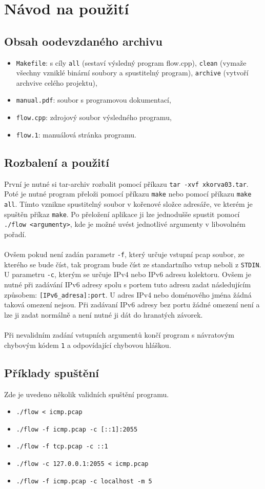 \documentclass[12pt]{article}
\begin{document}
\section{Návod na použití}
\subsection{Obsah oodevzdaného archivu}
\begin{itemize}
	\item {\texttt{Makefile}: s cíly \texttt{all} (sestaví výsledný program flow.cpp), \texttt{clean} (vymaže všechny vzniklé binární soubory a spustitelný program), \texttt{archive} (vytvoří archvive celého projektu),}
	\item {\texttt{manual.pdf}: soubor s programovou dokumentací,}
	\item {\texttt{flow.cpp}: zdrojový soubor výsledného programu,}
	\item {\texttt{flow.1}: manuálová stránka programu.}
\end{itemize}
\subsection{Rozbalení a použití}
První je nutné si tar-archiv rozbalit pomocí příkazu \texttt{tar -xvf xkorva03.tar}. Poté je nutné program přeloži pomocí příkazu \texttt{make} nebo
pomocí příkazu \texttt{make all}. Tímto vznikne spustitelný soubor v kořenové složce adresáře, ve kterém je spuštěn příkaz \texttt{make}. 
Po přeložení aplikace ji lze jednodušše spustit pomocí \texttt{./flow <argumenty>}, kde je možné uvést jednotlivé argumenty v libovolném pořadí.
\\\\ 
Ovšem pokud není zadán parametr \texttt{-f}, který určuje vstupní pcap soubor, ze kterého se bude číst, tak program bude číst ze standartního vstup neboli z \texttt{STDIN}.  
U parametru \texttt{-c}, kterým se určuje IPv4 nebo IPv6 adresu kolektoru. Ovšem je nutné při zadávání IPv6 adresy spolu s portem tuto adresu zadat následujícím způsobem: \texttt{[IPv6\_adresa]:port}. U adres IPv4 nebo doménového jména žádná taková omezení nejsou.
Při zadávaní IPv6 adresy bez portu žádné omezení není a lze ji zadat normálně a není nutné ji dát do hranatých závorek.
\\\\
Při nevalidním zadání vstupních argumentů končí program s návratovým chybovým kódem \texttt{1} a odpovídající chybovou hláškou.
\subsection*{Příklady spuštění}
Zde je uvedeno několik validních spuštění programu.
\begin{itemize}
	\item \texttt{./flow < icmp.pcap}
	\item \texttt{./flow -f icmp.pcap -c [::1]:2055}
	\item \texttt{./flow -f tcp.pcap -c ::1}
	\item \texttt{./flow -c 127.0.0.1:2055 < icmp.pcap}
	\item \texttt{./flow -f icmp.pcap -c localhost -m 5}
\end{itemize}
\pagebreak
\end{document}
